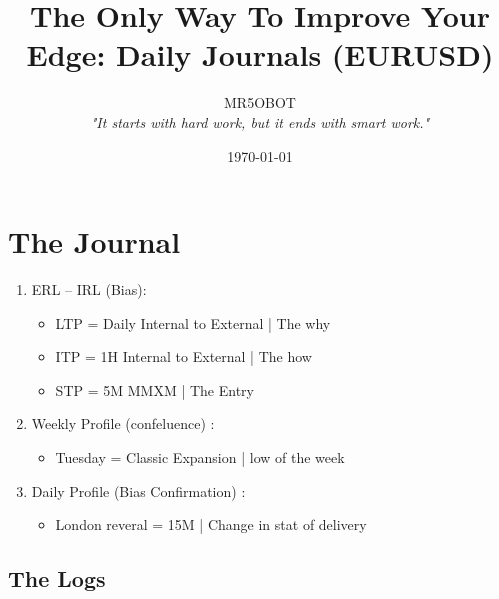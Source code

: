 \documentclass{article}
\title{The Only Way To Improve Your Edge: Daily Journals (EURUSD)}
\author{MR5OBOT \\ \textit{"It starts with hard work, but it ends with smart work."}}
\date{\today}
\begin{document}
\maketitle
\pagestyle{fancy}
\tableofcontents

\vspace{0.5cm}

\noindent\hdashrule[0.2ex]{\linewidth}{0.2pt}{1mm} 
\section{The Journal} 
\begin{enumerate}
  \item ERL -- IRL (Bias): 
\begin{itemize} 
  \item LTP = \hspace{0.3pt} Daily Internal to External | The why
  \item ITP = \hspace{0.3pt} 1H Internal to External | The how 
  \item STP = \hspace{0.3pt} 5M MMXM | The Entry 
\end{itemize}

    \item Weekly Profile (confeluence)  : 

\begin{itemize} 
  \item Tuesday = \hspace{0.3pt} Classic Expansion | low of the week
\end{itemize}

    \item Daily Profile (Bias Confirmation)  : 
\begin{itemize} 
  \item London reveral = \hspace{0.3pt} 15M | Change in stat of delivery
\end{itemize}

\end{enumerate}

\subsection{The Logs}

\renewcommand{\arraystretch}{1.5} %
\setlength{\tabcolsep}{10pt} %
\end{document}
